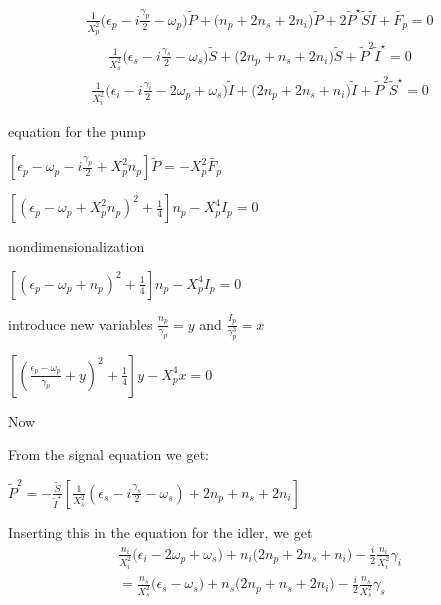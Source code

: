 \documentclass[a4paper,prb,10pt,aps,twocolumn]{revtex4-1}
\begin{document}
\begin{multline}
  \label{eq:39}
\frac{1}{X_{p}^{2}}\Bigg(\epsilon_{p}-i\frac{\gamma_{p}}{2}-\omega_{p}\Bigg)\tilde{P}+\Bigg(n_{p}+2n_{s}+2n_{i}\Bigg)\tilde{P}+2\tilde{P}^{\star}\tilde{S}\tilde{I}+\tilde{F_{p}}=0
\end{multline}
\begin{multline}
  \label{eq:40}
\frac{1}{X_{s}^{2}}\Bigg(\epsilon_{s}-i\frac{\gamma_{s}}{2}-\omega_{s}\Bigg)\tilde{S}+\Bigg(2n_{p}+n_{s}+2n_{i}\Bigg)\tilde{S}+\tilde{P}^{2}\tilde{I}^{\star}=0
\end{multline}
\begin{multline}
  \label{eq:41}
\frac{1}{X_{i}^{2}}\Bigg(\epsilon_{i}-i\frac{\gamma_{i}}{2}-2\omega_{p}+\omega_{s}\Bigg)\tilde{I}+\Bigg(2n_{p}+2n_{s}+n_{i}\Bigg)\tilde{I}+\tilde{P}^{2}\tilde{S}^{\star}=0
\end{multline}


equation for the pump

$\left[\epsilon_{p}-\omega_{p}-i\frac{\gamma_{p}}{2}+X_{p}^{2}n_{p}\right]\tilde{P}=-X_{p}^{2}\tilde{F_{p}}$

$\left[\left(\epsilon_{p}-\omega_{p}+X_{p}^{2}n_{p}\right)^{2}+\frac{1}{4}\right]n_{p}-X_{p}^{4}I_{p}=0$

nondimensionalization

$\left[\left(\epsilon_{p}-\omega_{p}+n_{p}\right)^{2}+\frac{1}{4}\right]n_{p}-X_{p}^{4}I_{p}=0$

introduce new variables $\frac{n_{p}}{\gamma_{p}}=y$ and $\frac{I_{p}}{\gamma_{p}^{3}}=x$ 

$\left[\left(\frac{\epsilon_{p}-\omega_{p}}{\gamma_{p}}+y\right)^{2}+\frac{1}{4}\right]y-X_{p}^{4}x=0$

Now

From the signal equation we get:

$\tilde{P}^{2}=-\frac{\tilde{S}}{\tilde{I}^{\star}}\left[\frac{1}{X_{s}^{2}}\left(\epsilon_{s}-i\frac{\gamma_{s}}{2}-\omega_{s}\right)+2n_{p}+n_{s}+2n_{i}\right]$

Inserting this in the equation for the idler, we get
\begin{multline}
  \label{eq:38}
\frac{n_{i}}{X_{i}^{2}}\Bigg(\epsilon_{i}-2\omega_{p}+\omega_{s}\Bigg)+n_{i}\Bigg(2n_{p}+2n_{s}+n_{i}\Bigg)-\frac{i}{2}\frac{n_{i}}{X_{i}^{2}}\gamma_{i}\\
=\frac{n_{s}}{X_{s}^{2}}\Bigg(\epsilon_{s}-\omega_{s}\Bigg)+n_{s}\Bigg(2n_{p}+n_{s}+2n_{i}\Bigg)-\frac{i}{2}\frac{n_{s}}{X_{s}^{2}}\gamma_{s}  
\end{multline}
\end{document}
